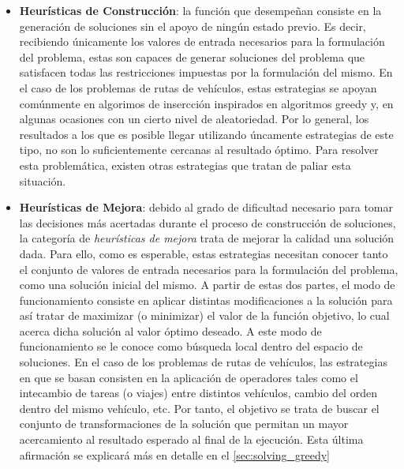 \documentclass{subfiles}
\begin{document}
      \begin{itemize}
          
          \item \textbf{Heurísticas de Construcción}: la función que desempeñan consiste en la generación de soluciones sin el apoyo de ningún estado previo. Es decir, recibiendo únicamente los valores de entrada necesarios para la formulación del problema, estas son capaces de generar soluciones del problema que satisfacen todas las restricciones impuestas por la formulación del mismo. En el caso de los problemas de rutas de vehículos, estas estrategias se apoyan comúnmente en algorimos de insercción inspirados en algoritmos greedy y, en algunas ocasiones con un cierto nivel de aleatoriedad. Por lo general, los resultados a los que es posible llegar utilizando úncamente estrategias de este tipo, no son lo suficientemente cercanas al resultado óptimo. Para resolver esta problemática, existen otras estrategias que tratan de paliar esta situación.

          \item \textbf{Heurísticas de Mejora}: debido al grado de dificultad necesario para tomar las decisiones más acertadas durante el proceso de construcción de soluciones, la categoría de \emph{heurísticas de mejora} trata de mejorar la calidad una solución dada. Para ello, como es esperable, estas estrategias necesitan conocer tanto el conjunto de valores de entrada necesarios para la formulación del problema, como una solución inicial del mismo. A partir de estas dos partes, el modo de funcionamiento consiste en aplicar distintas modificaciones a la solución para así tratar de maximizar (o minimizar) el valor de la función objetivo, lo cual acerca dicha solución al valor óptimo deseado. A este modo de funcionamiento se le conoce como búsqueda local dentro del espacio de soluciones. En el caso de los problemas de rutas de vehículos, las estrategias en que se basan consisten en la aplicación de operadores tales como el intecambio de tareas (o viajes) entre distintos vehículos, cambio del orden dentro del mismo vehículo, etc. Por tanto, el objetivo se trata de buscar el conjunto de transformaciones de la solución que permitan un mayor acercamiento al resultado esperado al final de la ejecución. Esta última afirmación se explicará más en detalle en el \cref{sec:solving_greedy}
      
      \end{itemize}
\end{document}
